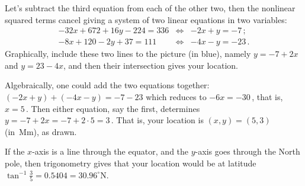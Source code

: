 \begin{example}
\begin{solution}
Let's subtract the third equation from each of the other two, then the nonlinear squared terms cancel giving a system of two linear equations in two variables:
\begin{eqnarray*}
-32x+672+16y-224=336&\iff&-2x+y=-7\,;
\\-8x+120-2y+37=111&\iff&-4x-y=-23\,.
\end{eqnarray*}%
%
Graphically, include these two lines to the picture (in blue), namely \(y=-7+2x\) and \(y=23-4x\), and then their intersection gives your location.

Algebraically, one could add the two equations together: \((-2x+y)+(-4x-y)=-7-23\) which reduces to \(-6x=-30\)\,, that is, \(x=5\)\,.
Then either equation, say the first, determines~\(y=-7+2x=-7+2\cdot 5=3\)\,.  
That is, your location is \((x,y)=(5,3)\) (in~Mm), as drawn.
\end{solution}
If the \(x\)-axis is a line through the equator, and the \(y\)-axis goes through the North pole, then trigonometry gives that your location would be at latitude
\(\tan^{-1}\frac35=0.5404=30.96^\circ\)N.
\end{example}






